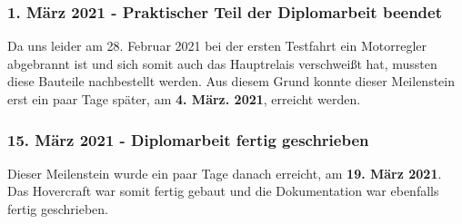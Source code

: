 \subsubsection*{1. März 2021 - Praktischer Teil der Diplomarbeit beendet}
Da uns leider am 28. Februar 2021 bei der ersten Testfahrt ein Motorregler abgebrannt ist und sich somit auch das Hauptrelais verschweißt hat, mussten
diese Bauteile nachbestellt werden. Aus diesem Grund konnte dieser Meilenstein erst ein paar Tage später, am \textbf{4. März. 2021}, erreicht werden.  

\subsubsection*{15. März 2021 - Diplomarbeit fertig geschrieben}
Dieser Meilenstein wurde ein paar Tage danach erreicht, am \textbf{19. März 2021}. Das Hovercraft war somit fertig gebaut und die Dokumentation war ebenfalls fertig geschrieben.

